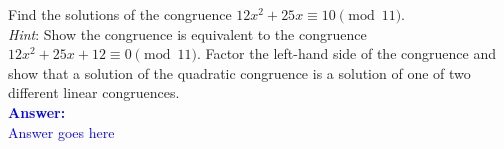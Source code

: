 \item{}
Find the solutions of the congruence $12x^2+25x\equiv10\pmod{11}$.\\
\emph{Hint}\/: Show the congruence is equivalent to the congruence $12x^2+25x+
12\equiv0\pmod{11}$. Factor the left-hand side of the congruence and show that a
solution of the quadratic congruence is a solution of one of two different
linear congruences.
\\[12pt]
\ifanswers
\textcolor{blue}{
\textbf{Answer:}\\[6pt]
Answer goes here
}
\newpage
\fi
